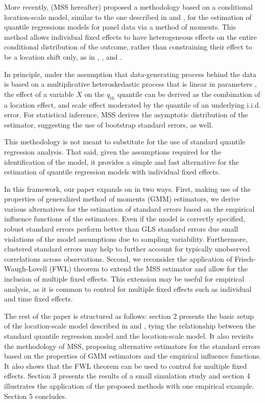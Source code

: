 \documentclass[
  12pt,
  oneside]{article}
\begin{document}
More recently, \citet{mss2019} (MSS hereafter) proposed a methodology
based on a conditional location-scale model, similar to the one
described in \citet{he1997} and \citet{zhao2000}, for the estimation of
quantile regressions models for panel data via a method of moments. This
method allows individual fixed effects to have heterogeneous effects on
the entire conditional distribution of the outcome, rather than
constraining their effect to be a location shift only, as in
\citet{canay2011}, \citet{koenker2004}, and \citet{lamarche2010}.

In principle, under the assumption that data-generating process behind
the data is based on a multiplicative heteroskedastic process that is
linear in parameters \citep[@he1997, @zhao2000, @cameron2005]{mss2019},
the effect of a variable \(X\) on the \(q_{th}\) quantile can be derived
as the combination of a location effect, and scale effect moderated by
the quantile of an underlying i.i.d. error. For statistical inference,
MSS derives the asymptotic distribution of the estimator, suggesting the
use of bootstrap standard errors, as well.

This methodology is not meant to substitute for the use of standard
quantile regression analysis. That said, given the assumptions required
for the identification of the model, it provides a simple and fast
alternative for the estimation of quantile regression models with
individual fixed effects.

In this framework, our paper expands on \citet{mss2019} in two ways.
First, making use of the properties of generalized method of moments
(GMM) estimators, we derive various alternatives for the estimation of
standard errors based on the empirical influence functions of the
estimators. Even if the model is correctly specified, robust standard
errors perform better than GLS standard errors due small violations of
the model assumptions due to sampling variability. Furthermore,
clustered standard errors may help to further account for typically
unobserved correlations across observations. Second, we reconsider the
application of Frisch-Waugh-Lovell (FWL) theorem \citep[ and
\citet{lovell1963}]{frishwaugh1933} to extend the MSS estimator and
allow for the inclusion of multiple fixed effects. This extension may be
useful for empirical analysis, as it is common to control for multiple
fixed effects such as individual and time fixed effects.

The rest of the paper is structured as follows: section 2 presents the
basic setup of the location-scale model described in \citet{he1997} and
\citet{zhao2000}, tying the relationship between the standard quantile
regression model and the location-scale model. It also revisits the
methodology of MSS, proposing alternative estimators for the standard
errors based on the properties of GMM estimators and the empirical
influence functions. It also shows that the FWL theorem can be used to
control for multiple fixed effects. Section 3 presents the results of a
small simulation study and section 4 illustrates the application of the
proposed methods with one empirical example. Section 5 concludes.
\end{document}
